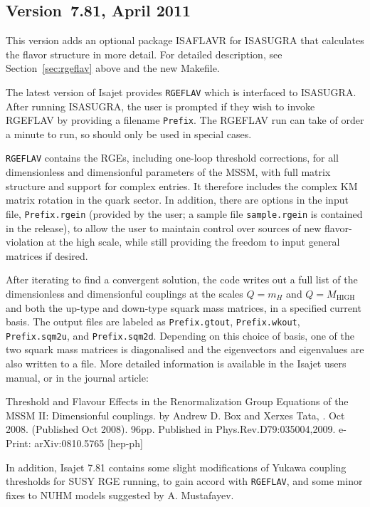 \subsection{Version~7.81, April 2011}

This version adds an optional package ISAFLAVR for ISASUGRA that
calculates the flavor structure in more detail. For detailed description, 
see Section~\ref{sec:rgeflav} above and the new Makefile.

The latest version of Isajet provides \texttt{RGEFLAV} which is interfaced to ISASUGRA.
After running ISASUGRA, the user is prompted if they wish to invoke RGEFLAV by providing a
filename \texttt{Prefix}. The RGEFLAV run can take
of order a minute to run, so should only be used in special cases.

\texttt{RGEFLAV} contains the RGEs, including one-loop threshold corrections, 
for all dimensionless and dimensionful parameters of the MSSM, 
with full matrix structure and support for complex entries. 
It therefore includes the complex KM matrix rotation in the quark sector. 
In addition, there are options in the input file, \texttt{Prefix.rgein} 
(provided by the user; a sample file \texttt{sample.rgein} is contained in the release), 
to allow the user to maintain control over sources of new flavor-violation at the high scale, 
while still providing the freedom to input general matrices if desired.

After iterating to find a convergent solution, the code writes out a full list of the 
dimensionless and dimensionful couplings at the scales $Q=m_H$ and $Q=M_{\mathrm{HIGH}}$ 
and both the up-type and down-type squark mass matrices, in a specified current basis. 
The output files are labeled as \texttt{Prefix.gtout}, \texttt{Prefix.wkout}, 
\texttt{Prefix.sqm2u}, and \texttt{Prefix.sqm2d}.
Depending on this choice of basis, one of the two squark mass matrices is diagonalised 
and the eigenvectors and eigenvalues are also written to a file.
More detailed information is available in the Isajet users manual, or in the journal article:

Threshold and Flavour Effects in the Renormalization Group Equations of the MSSM II: Dimensionful couplings.
by Andrew D. Box and Xerxes Tata, . Oct 2008. (Published Oct 2008). 96pp.
Published in Phys.Rev.D79:035004,2009.
e-Print: arXiv:0810.5765 [hep-ph] 

In addition, Isajet 7.81 contains some slight modifications of Yukawa coupling thresholds
for SUSY RGE running, to gain accord with \texttt{RGEFLAV}, and some minor fixes
to NUHM models suggested by A. Mustafayev.

